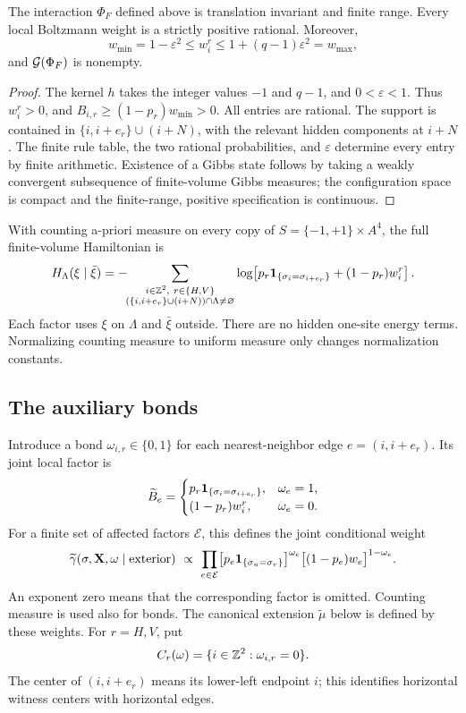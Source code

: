 \begin{lemma}\label{lem:positive}
The interaction \(\Phi_F\) defined above is translation invariant and finite range. Every local Boltzmann weight is a strictly positive rational. Moreover,
\begin{equation}
 w_{\min}=1-\varepsilon^2\le w_i^r\le
 1+(q-1)\varepsilon^2=w_{\max},
 \label{eq:w-bounds}
\end{equation}
and \(\mathcal G(\Phi_F)\) is nonempty.
\end{lemma}
\begin{proof}
The kernel \(h\) takes the integer values \(-1\) and \(q-1\), and \(0<\varepsilon<1\). Thus \(w_i^r>0\), and
\(B_{i,r}\ge(1-p_r)w_{\min}>0\).
All entries are rational. The support is contained in
\(\{i,i+e_r\}\cup(i+N)\), with the relevant hidden components at \(i+N\).
The finite rule table, the two rational probabilities, and \(\varepsilon\) determine every entry by finite arithmetic. Existence of a Gibbs state follows by taking a weakly convergent subsequence of finite-volume Gibbs measures; the configuration space is compact and the finite-range, positive specification is continuous.
\end{proof}

With counting a-priori measure on every copy of $S=\{-1,+1\}\times A^4$, the full finite-volume Hamiltonian is
\[
 H_\Lambda(\xi\mid\bar\xi)=
 -\!\!\sum_{\substack{i\in\mathbb Z^2,\ r\in\{H,V\}\\
           (\{i,i+e_r\}\cup(i+N))\cap\Lambda\ne\varnothing}}
 \log\!\left[p_r\mathbf 1_{\{\sigma_i=\sigma_{i+e_r}\}}
                    +(1-p_r)w_i^r\right].
\]
Each factor uses $\xi$ on $\Lambda$ and $\bar\xi$ outside. There are no hidden one-site energy terms. Normalizing counting measure to uniform measure only changes normalization constants.

\subsection{The auxiliary bonds}

Introduce a bond \(\omega_{i,r}\in\{0,1\}\) for each nearest-neighbor edge \(e=(i,i+e_r)\). Its joint local factor is
\begin{equation}
 \widetilde B_e=
 \begin{cases}
 p_r\mathbf 1_{\{\sigma_i=\sigma_{i+e_r}\}},&\omega_e=1,\\
 (1-p_r)w_i^r,&\omega_e=0.
 \end{cases}
 \label{eq:ESfactor}
\end{equation}
For a finite set of affected factors $\mathcal E$, this defines the joint conditional weight
\[
 \widetilde\gamma(\sigma,\mathbf X,\omega\mid\text{exterior})
 \ \propto\ \prod_{e\in\mathcal E}
 \bigl[p_e\mathbf 1_{\{\sigma_u=\sigma_v\}}\bigr]^{\omega_e}
 \bigl[(1-p_e)w_e\bigr]^{1-\omega_e}.
\]
An exponent zero means that the corresponding factor is omitted. Counting measure is used also for bonds. The canonical extension $\widetilde\mu$ below is defined by these weights. For $r=H,V$, put
\[
 C_r(\omega)=\{i\in\mathbb Z^2:\omega_{i,r}=0\}.
\]
The center of $(i,i+e_r)$ means its lower-left endpoint $i$; this identifies horizontal witness centers with horizontal edges.

